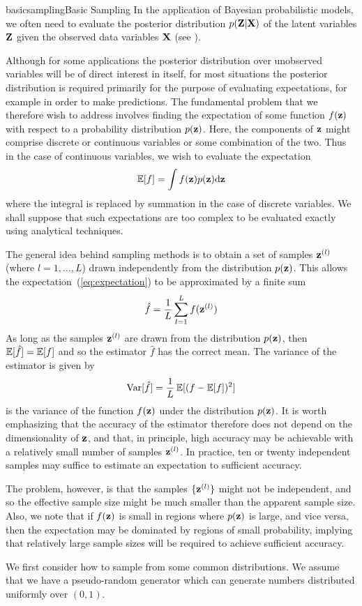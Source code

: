 \documentclass[9pt]{article}
\begin{document}
\begin{topic}{basicsampling}{Basic Sampling}
In the application of Bayesian probabilistic models, we often need to evaluate the posterior distribution $p(\mathbf{Z}|\mathbf{X})$ of the latent variables $\mathbf{Z}$ given the observed data variables $\mathbf{X}$ (see ).

Although for some applications the posterior distribution over unobserved variables will be of direct interest in itself, for most situations the posterior distribution is required primarily for the purpose of evaluating expectations, for example in order to make predictions. The fundamental problem that we therefore wish to address involves finding the expectation of some function $f(\mathbf{z})$ with respect to a probability distribution $p(\mathbf{z})$. Here, the components of $\mathbf{z}$ might comprise discrete or continuous variables or some combination of the two. Thus in the case of continuous variables, we wish to evaluate the expectation
\begin{equation}
\label{eq:expectation}
\operatorname{\mathbb{E}}[f] = \int f(\mathbf{z})p(\mathbf{z})\mathrm{d} \mathbf{z}
\end{equation}
where the integral is replaced by summation in the case of discrete variables.  We shall suppose that such expectations are too complex to be evaluated exactly using analytical techniques.

The general idea behind sampling methods is to obtain a set of samples $\mathbf{z}^{(l)}$ (where $l = 1,\ldots, L$) drawn independently from the distribution $p(\mathbf{z})$. This allows the expectation~(\ref{eq:expectation}) to be approximated by a finite sum
\[
\hat{f} = \frac{1}{L}\sum_{l=1}^{L} f(\mathbf{z}^{(l)})
\]
As long as the samples $\mathbf{z}^{(l)}$ are drawn from the distribution $p(\mathbf{z})$, then $\operatorname{\mathbb{E}}[\hat{f}] = \operatorname{\mathbb{E}}[f]$ and so the estimator $\hat{f}$ has the correct mean. The variance of the estimator is given by
\[
	\text{Var}[\hat{f}] = \frac{1}{L}\operatorname{\mathbb{E}}[(f-\operatorname{\mathbb{E}}[f])^2]
\]
is the variance of the function $f(\mathbf{z})$ under the distribution $p(\mathbf{z})$. It is worth emphasizing that the accuracy of the estimator therefore does not depend on the dimensionality of $\mathbf{z}$, and that, in principle, high accuracy may be achievable with a relatively small number of samples $\mathbf{z}^{(l)}$. In practice, ten or twenty independent samples may suffice to estimate an expectation to sufficient accuracy.

The problem, however, is that the samples $\{\mathbf{z}^{(l)}\}$ might not be independent, and so the effective sample size might be much smaller than the apparent sample size. Also, we note that if $f(\mathbf{z})$ is small in regions where $p(\mathbf{z})$ is large, and vice versa, then the expectation may be dominated by regions of small probability, implying that relatively large sample sizes will be required to achieve sufficient accuracy.

We first consider how to sample from some common distributions. We assume that we have a pseudo-random generator which can generate numbers distributed uniformly over $(0,1)$.

\Working


\end{topic}
\end{document}
